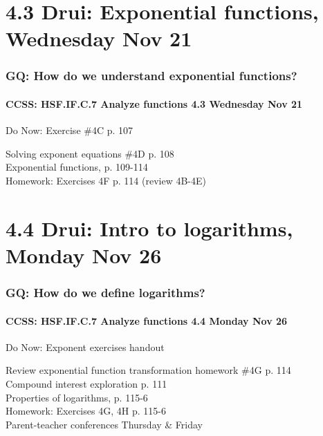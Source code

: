 \documentclass{beamer}
\begin{document}
  \section{4.3 Drui: Exponential functions, Wednesday Nov 21}
    \frame
    {
      \frametitle{GQ: How do we understand exponential functions?}
      \framesubtitle{CCSS: HSF.IF.C.7 Analyze functions    \alert{4.3  Wednesday Nov 21}}

      \begin{block}{Do Now: Exercise \#4C p. 107}
      \end{block}
      Solving exponent equations \#4D p. 108 \\
      Exponential functions, p. 109-114\\ \bigskip
      Homework: Exercises 4F p. 114 (review 4B-4E)
    }

  \section{4.4 Drui: Intro to logarithms, Monday Nov 26}
    \frame
    {
      \frametitle{GQ: How do we define logarithms?}
      \framesubtitle{CCSS: HSF.IF.C.7 Analyze functions    \alert{4.4 Monday Nov 26}}

      \begin{block}{Do Now: Exponent exercises handout}
      \end{block}
      Review exponential function transformation homework \#4G p. 114 \\
      Compound interest exploration p. 111\\
      Properties of logarithms, p. 115-6\\\bigskip
      Homework: Exercises 4G, 4H p. 115-6\\
      \alert{Parent-teacher conferences Thursday \& Friday}
    }
\end{document}
